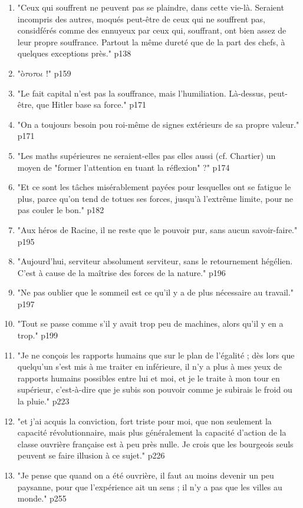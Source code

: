\documentclass[a4paper,12pt]{book}
\newcommand{\Cit}[2]{\begin{tcolorbox}[sharp corners, colback=white,colframe=red!90!black!75, title=Citations : #1]#2\end{tcolorbox}}
\begin{document}
\Cit{La Condition Ouvrière 2}{\begin{enumerate}
\item "Ceux qui souffrent ne peuvent pas se plaindre, dans cette vie-là. Seraient incompris des autres, moqués peut-être de ceux qui ne souffrent pas, considférés comme des ennuyeux par ceux qui, souffrant, ont bien assez de leur propre souffrance. Partout la même dureté que de la part des chefs, à quelques exceptions près." p138
\item "ò$\tau$o$\tau$o$\iota$ !" p159
\item "Le fait capital n'est pas la souffrance, mais l'humiliation. Là-dessus, peut-être, que Hitler base sa force." p171
\item "On a toujours besoin pou roi-même de signes extérieurs de sa propre valeur." p171
\item "Les maths supérieures ne seraient-elles pas elles aussi (cf. Chartier) un moyen de "former l'attention en tuant la réflexion" ?" p174
\item "Et ce sont les tâches misérablement payées pour lesquelles ont se fatigue le plus, parce qu'on tend de totues ses forces, jusqu'à l'extrême limite, pour ne pas couler le bon." p182
\item "Aux héros de Racine, il ne reste que le pouvoir pur, sans aucun savoir-faire." p195
\item "Aujourd'hui, serviteur absolument serviteur, sans le retournement hégélien. C'est à cause de la maîtrise des forces de la nature." p196
\item "Ne pas oublier que le sommeil est ce qu'il y a de plus nécessaire au travail." p197
\item "Tout se passe comme s'il y avait trop peu de machines, alors qu'il y en a trop." p199
\item "Je ne conçois les rapports humains que sur le plan de l'égalité ; dès lors que quelqu'un s'est mis à me traiter en inférieure, il n'y a plus à mes yeux de rapports humains possibles entre lui et moi, et je le traite à mon tour en supérieur, c'est-à-dire que je subis son pouvoir comme je subirais le froid ou la pluie." p223
\item "et j'ai acquis la conviction, fort triste pour moi, que non seulement la capacité révolutionnaire, mais plus généralement la capacité d'action de la classe ouvrière française est à peu près nulle. Je crois que les bourgeois seuls peuvent se faire illusion à ce sujet." p226
\item "Je pense que quand on a été ouvrière, il faut au moins devenir un peu paysanne, pour que l'expérience ait un sens ; il n'y a pas que les villes au monde." p255

\end{enumerate}}
\end{document}
